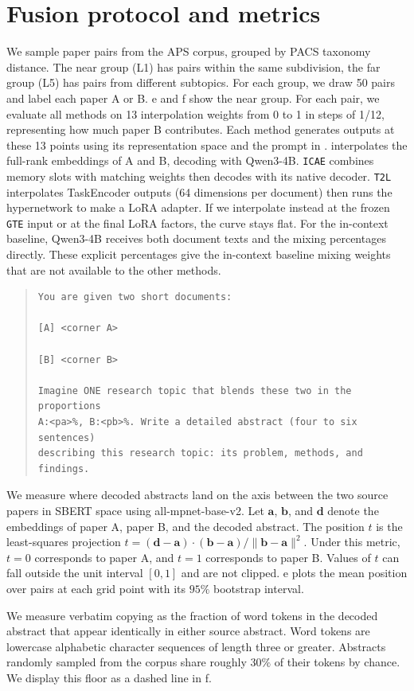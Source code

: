 \section{Fusion protocol and metrics}
\label{app:edge-protocol}



We sample paper pairs from the APS corpus, grouped by PACS taxonomy distance. The near group (L1) has pairs within the same subdivision, the far group (L5) has pairs from different subtopics. For each group, we draw 50 pairs and label each paper A or B. e and f show the near group.
For each pair, we evaluate all methods on 13 interpolation weights from 0 to 1 in steps of 1/12, representing how much paper B contributes. Each method generates outputs at these 13 points using its representation space and the prompt in .
\doctolora interpolates the full-rank embeddings of A and B, decoding with Qwen3-4B. \texttt{ICAE} combines memory slots with matching weights then decodes with its native decoder. \texttt{T2L} interpolates TaskEncoder outputs (64 dimensions per document) then runs the hypernetwork to make a LoRA adapter. If we interpolate instead at the frozen \texttt{GTE} input or at the final LoRA factors, the curve stays flat. For the in-context baseline, Qwen3-4B receives both document texts and the mixing percentages directly.
These explicit percentages give the in-context baseline mixing weights that are not available to the other methods.

\begin{quote}
\begin{Verbatim}[breaklines=true,breakanywhere=true,fontsize=\footnotesize]
You are given two short documents:

[A] <corner A>

[B] <corner B>

Imagine ONE research topic that blends these two in the proportions
A:<pa>%, B:<pb>%. Write a detailed abstract (four to six sentences)
describing this research topic: its problem, methods, and findings.
\end{Verbatim}
\end{quote}

We measure where decoded abstracts land on the axis between the two source papers in SBERT space using all-mpnet-base-v2.
Let $\mathbf{a}$, $\mathbf{b}$, and $\mathbf{d}$ denote the embeddings of paper A, paper B, and the decoded abstract.
The position $t$ is the least-squares projection $t = (\mathbf{d}-\mathbf{a})\cdot(\mathbf{b}-\mathbf{a}) / \lVert \mathbf{b}-\mathbf{a}\rVert^2$.
Under this metric, $t=0$ corresponds to paper A, and $t=1$ corresponds to paper B.
Values of $t$ can fall outside the unit interval $[0,1]$ and are not clipped.
e plots the mean position over pairs at each grid point with its $95\%$ bootstrap interval.

We measure verbatim copying as the fraction of word tokens in the decoded abstract that appear identically in either source abstract.
Word tokens are lowercase alphabetic character sequences of length three or greater.
Abstracts randomly sampled from the corpus share roughly $30\%$ of their tokens by chance.
We display this floor as a dashed line in f.
